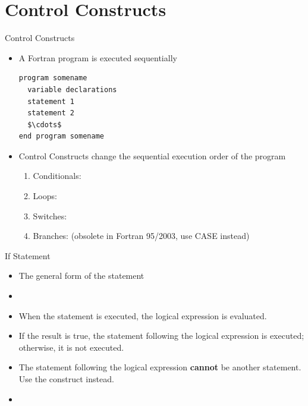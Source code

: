 \documentclass[10pt,t]{beamer}
\begin{document}
\section{Control Constructs}
\begin{frame}[fragile] {Control Constructs}
  \begin{itemize}
    \item A Fortran program is executed sequentially
      \begin{lstlisting}[language={[90]Fortran},mathescape]
program somename 
  variable declarations
  statement 1
  statement 2
  $\cdots$
end program somename
      \end{lstlisting}
    \item Control Constructs change the sequential execution order of the program
      \begin{enumerate} %
        \item Conditionals: 
        \item Loops: 
        \item Switches: 
        \item Branches:  (obsolete in Fortran 95/2003, use CASE instead)
      \end{enumerate}
  \end{itemize}
\end{frame}

\begin{frame}[fragile]{If Statement}
  \begin{itemize}
    \item The general form of the  statement
    \item[] 
    \item When the  statement is executed, the logical expression is evaluated. 
    \item If the result is true, the statement following the logical expression is executed; otherwise, it is not executed.
    \item The statement following the logical expression \textbf{cannot} be another  statement. Use the  construct instead.
    \item[] 
  \end{itemize}
\end{frame}
\end{document}
